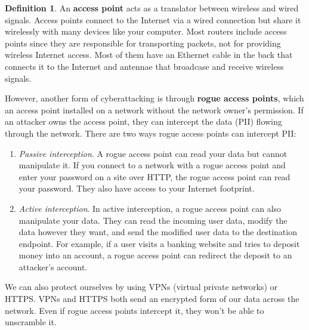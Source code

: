 \documentclass[a4paper, 12pt]{report}
\theoremstyle{remark}
\theoremstyle{definition}
\newtheorem{definition}{Definition}[section]
\begin{document}
\begin{definition}
An \textbf{access point} acts as a translator between wireless and wired signals. Access points connect to the Internet via a wired connection but share it wirelessly with many devices like your computer. Most routers include access points since they are responsible for transporting packets, not for providing wireless Internet access. Most of them have an Ethernet cable in the back that connects it to the Internet and antennae that broadcase and receive wireless signals. 
\end{definition}

However, another form of cyberattacking is through \textbf{rogue access points}, which an access point installed on a network without the network owner's permission. If an attacker owns the access point, they can intercept the data (PII) flowing through the network. There are two ways rogue access points can intercept PII: 
\begin{enumerate}
    \item \textit{Passive interception}. A rogue access point can read your data but cannot manipulate it. If you connect to a network with a rogue access point and enter your password on a site over HTTP, the rogue access point can read your password. They also have access to your Internet footprint. 
    \item \textit{Active interception}. In active interception, a rogue access point can also manipulate your data. They can read the incoming user data, modify the data however they want, and send the modified user data to the destination endpoint. For example, if a user visits a banking website and tries to deposit money into an account, a rogue access point can redirect the deposit to an attacker’s account. 
\end{enumerate}

We can also protect ourselves by using VPNs (virtual private networks) or HTTPS. VPNs and HTTPS both send an encrypted form of our data across the network. Even if rogue access points intercept it, they won’t be able to unscramble it. 
\end{document}
